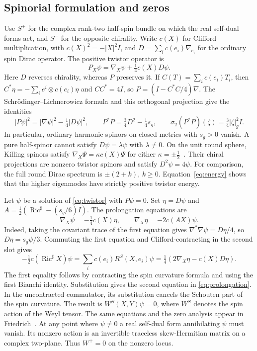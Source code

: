 \documentclass[11pt]{article}
\numberwithin{equation}{section}
\DeclareMathOperator{\Ric}{Ric}
\newcommand{\abs}[1]{\lvert #1\rvert}
\begin{document}
\subsection{Spinorial formulation and zeros}

Use \(S^+\) for the complex rank-two half-spin bundle on which the
real self-dual forms act, and \(S^-\) for the opposite chirality.
Write \(c(X)\) for Clifford multiplication, with
\(c(X)^2=-\abs{X}^2 I\), and \(D=\sum_i c(e_i)\nabla_{e_i}\)
for the ordinary spin Dirac operator. The positive twistor operator is
\begin{equation}\label{eq:twistor}
 P_X\psi=\nabla_X\psi+\tfrac14c(X)D\psi .
\end{equation}
Here \(D\) reverses chirality, whereas \(P\) preserves it. If
\(C(T)=\sum_i c(e_i)T_i\), then \(C^*\eta=-\sum_i e^i\otimes c(e_i)\eta\)
and \(CC^*=4I\), so \(P=(I-C^*C/4)\nabla\).
The Schr\"odinger--Lichnerowicz formula and this orthogonal projection
give the identities
\begin{equation}\label{eq:energy}
 \abs{P\psi}^2=\abs{\nabla\psi}^2-\tfrac14\abs{D\psi}^2,\qquad
 P^*P=\tfrac34D^2-\tfrac14s_g,\qquad
 \sigma_2(P^*P)(\zeta)=\tfrac34\abs{\zeta}_g^2 I .
\end{equation}
In particular, ordinary harmonic spinors on closed metrics with
\(s_g>0\) vanish. A pure half-spinor cannot satisfy
\(D\psi=\lambda\psi\) with \(\lambda\ne0\). On the unit round sphere,
Killing spinors satisfy \(\nabla_X\Psi=\kappa c(X)\Psi\) for either
\(\kappa=\pm\tfrac12\)~\cite[\S2]{Bar1996SphereDirac}. Their chiral
projections are nonzero twistor spinors and satisfy
\(D^2\psi=4\psi\). For comparison, the full round Dirac spectrum is
\(\pm(2+k)\), \(k\ge0\). Equation~\eqref{eq:energy} shows that the
higher eigenmodes have strictly positive twistor energy.

Let \(\psi\) be a solution of \eqref{eq:twistor} with \(P\psi=0\).
Set \(\eta=D\psi\) and \(A=\tfrac12(\Ric^\sharp-(s_g/6)I)\).
The prolongation equations are
\begin{equation}\label{eq:prolongation}
 \nabla_X\psi=-\tfrac14c(X)\eta,\qquad
 \nabla_X\eta=-2c(A X)\psi .
\end{equation}
Indeed, taking the covariant trace of the first equation gives
\(\nabla^*\nabla\psi=D\eta/4\), so \(D\eta=s_g\psi/3\).
Commuting the first equation and Clifford-contracting in the second
slot gives
\[
 -\tfrac12 c(\Ric^\sharp X)\psi
   =\sum_i c(e_i)R^S(X,e_i)\psi
   =\tfrac14(2\nabla_X\eta-c(X)D\eta).
\]
The first equality follows by contracting the spin curvature formula
and using the first Bianchi identity. Substitution gives the second
equation in \eqref{eq:prolongation}. In the uncontracted commutator,
its substitution cancels the Schouten part of the spin curvature.
The result is \(W^S(X,Y)\psi=0\), where \(W^S\) denotes the spin
action of the Weyl tensor. The same equations and the zero analysis
appear in Friedrich~\cite[\S2]{Friedrich1990TwistorSpinors}.
At any point where \(\psi\ne0\) a real self-dual form annihilating
\(\psi\) must vanish. Its nonzero action is an invertible traceless
skew-Hermitian matrix on a complex two-plane. Thus \(W^+=0\) on the
nonzero locus.
\end{document}
